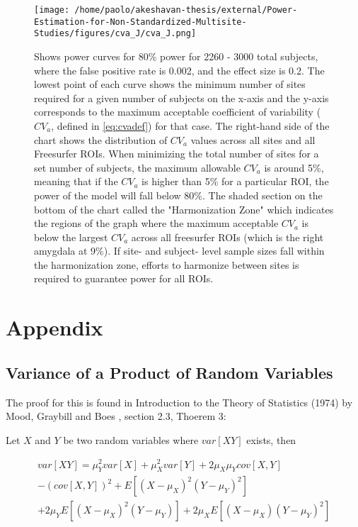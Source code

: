 \documentclass{article}
\begin{document}
\begin{figure}[]
\begin{center}
\texttt{[image: /home/paolo/akeshavan-thesis/external/Power-Estimation-for-Non-Standardized-Multisite-Studies/figures/cva\_J/cva\_J.png]}
\caption{ \protect\label{fig:cv_j} Shows power curves for 80\% power for 2260 - 3000 total subjects, where the false positive rate is 0.002, and the effect size is 0.2. The lowest point of each curve shows the minimum number of sites required for a given number of subjects on the x-axis and the y-axis corresponds to the maximum acceptable coefficient of variability ($CV_{a}$, defined in \ref{eq:cvadef}) for that case. The right-hand side of the chart shows the distribution of $CV_{a}$ values across all sites and all Freesurfer ROIs. When minimizing the total number of sites for a set number of subjects, the maximum allowable $CV_{a}$ is around 5\%, meaning that if the $CV_{a}$ is higher than 5\% for a particular ROI, the power of the model will fall below 80\%. The shaded section on the bottom of the chart called the "Harmonization Zone" which indicates the regions of the graph where the maximum acceptable $CV_{a}$ is below the largest $CV_{a}$ across all freesurfer ROIs (which is the right amygdala at 9\%). If site- and subject- level sample sizes fall within the harmonization zone, efforts to harmonize between sites is required to guarantee power for all ROIs.}
\end{center}
\end{figure}

\clearpage
\section{Appendix}
\subsection{Variance of a Product of Random Variables}

The proof for this is found in Introduction to the Theory of Statistics (1974) by Mood, Graybill and Boes \cite{boes1974introduction}, section 2.3, Thoerem 3:

Let $X$ and $Y$ be two random variables where $var[XY]$ exists, then

\begin{equation}
\begin{split}
var[XY] = \mu_Y^2var[X] + \mu_X^2var[Y] + 2\mu_X\mu_Ycov[X,Y] 
\\
- (cov[X,Y])^2 + E[(X-\mu_X)^2(Y-\mu_Y)^2] 
\\
+ 2\mu_YE[(X-\mu_X)^2(Y-\mu_Y)] + 2\mu_XE[(X-\mu_X)(Y-\mu_Y)^2]
\end{split}
\end{equation}
\end{document}
